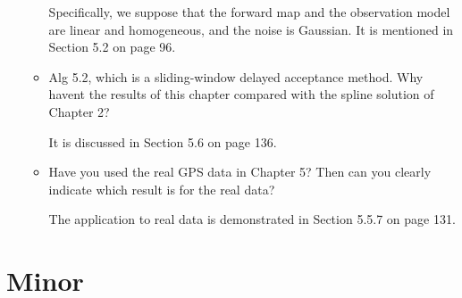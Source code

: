 \documentclass[a4paper,18pt]{extarticle}
\begin{document}
\begin{itemize}
\begin{itemize}
		Specifically, we suppose that the forward map and the observation model are linear and homogeneous, and the noise is Gaussian. It is mentioned in Section 5.2 on page 96.
		
		
		\item Alg 5.2, which is a sliding-window delayed acceptance method. Why havent the results of this chapter compared with the spline solution of Chapter 2?
		
		It is discussed in Section 5.6 on page 136.	
		
		\item Have you used the real GPS data in Chapter 5? Then can you clearly indicate which result is for the real data?
		
		The application to real data is demonstrated in Section 5.5.7 on page 131.
		 
	\end{itemize}
	

\end{itemize}

\section{Minor}
\end{document}
